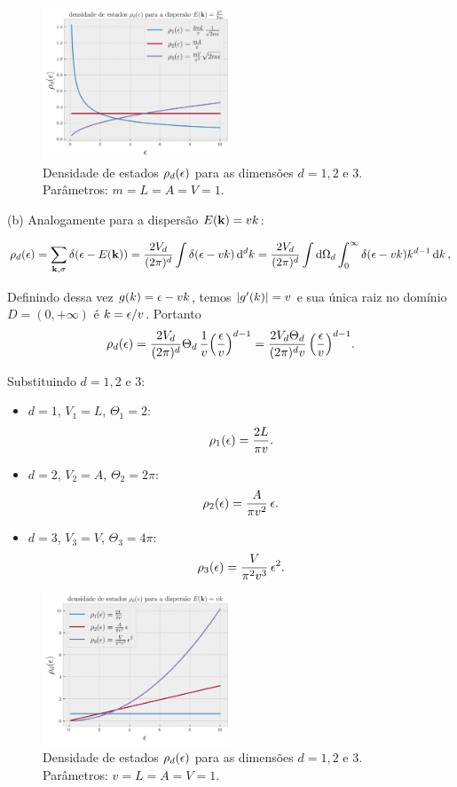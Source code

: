 \documentclass[a4paper,10pt]{article}
\begin{document}
\begin{figure}[H]
\centering
\includegraphics[width=0.5\textwidth]{fig/dos-k2.png}
\caption{Densidade de estados $\rho_d(\epsilon)$ para as dimensões $d = 1, 2$ e $3$. Parâmetros: $m = L = A = V = 1$.}
\label{fig:dosk2}
\end{figure}

(b) Analogamente para a dispersão $E(\vb{k}) = vk$:


$$
\rho_d(\epsilon) = \sum_{\vb{k}, \sigma} \delta(\epsilon - E(\vb{k})) =
\frac{2V_d}{(2\pi)^d} \int \delta\qty(\epsilon - vk) \dd[d]{k} =
\frac{2V_d}{(2\pi)^d} \int \dd{\Omega_d} \int_0^\infty \delta\qty(\epsilon - vk) k^{d-1} \dd{k},
$$

Definindo dessa vez $g(k) = \epsilon - vk$, temos $\abs{g'(k)} = v$ e sua única raiz no domínio $D = (0, +\infty)$ é $k = \epsilon/v$. Portanto
$$
\rho_d(\epsilon) = \frac{2V_d}{(2\pi)^d} \Theta_d \, \frac{1}{v}
\qty(\frac{\epsilon}{v})^{d-1} = \frac{2 V_d \Theta_d}{(2\pi)^d v} \, \qty(\frac{\epsilon}{v})^{d-1}.
$$

Substituindo $d = 1, 2$ e $3$:
\begin{itemize}
\item $d = 1$, $V_1 = L$, $\Theta_1 = 2$:
$$
\rho_1(\epsilon) = \frac{2 L}{\pi v}.
$$
\item $d = 2$, $V_2 = A$, $\Theta_2 = 2\pi$:
$$
\rho_2(\epsilon) = \frac{A}{\pi v^2} \, \epsilon.
$$
\item $d = 3$, $V_3 = V$, $\Theta_3 = 4\pi$:
$$
\rho_3(\epsilon) = \frac{V}{\pi^2 v^3} \, \epsilon^2.
$$
\end{itemize}

\begin{figure}[H]
\centering
\includegraphics[width=0.5\textwidth]{fig/dos-vk.png}
\caption{Densidade de estados $\rho_d(\epsilon)$ para as dimensões $d = 1, 2$ e $3$. Parâmetros: $v = L = A = V = 1$.}
\label{fig:dosvk}
\end{figure}
\end{document}
